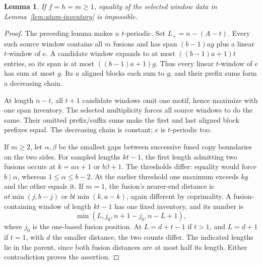 \documentclass[11pt,a4paper]{amsart}
\numberwithin{equation}{section}
\theoremstyle{plain}
\newtheorem{lemma}[theorem]{Lemma}
\theoremstyle{definition}
\begin{document}
\begin{lemma}\label{lem:equal-fusions}
If \(f=h=m\ge1\), equality of the selected window data in Lemma~\ref{lem:atom-inventory} is impossible.
\end{lemma}
\begin{proof}
The preceding lemma makes \(u\) \(t\)-periodic.  Set \(L_+=n-(A-t)\).  Every such source window contains all \(m\) fusions and has span \((b-1)ag\) plus a linear \(t\)-window of \(e\).  A candidate window expands to at most \(((b-1)a+1)t\) entries, so its span is at most \(((b-1)a+1)g\).  Thus every linear \(t\)-window of \(e\) has sum at most \(g\).  Its \(a\) aligned blocks each sum to \(g\), and their prefix sums form a decreasing chain.

At length \(n-t\), all \(t+1\) candidate windows omit one motif, hence maximize with one span inventory.  The selected multiplicity forces all source windows to do the same.  Their omitted prefix/suffix sums make the first and last aligned block prefixes equal.  The decreasing chain is constant; \(e\) is \(t\)-periodic too.

If \(m\ge2\), let \(\alpha,\beta\) be the smallest gaps between successive fused copy boundaries on the two sides.  For sampled lengths \(kt-1\), the first length admitting two fusions occurs at \(k=a\alpha+1\) or \(b\beta+1\).  The thresholds differ: equality would force \(b\mid\alpha\), whereas \(1\le\alpha\le b-2\).  At the earlier threshold one maximum exceeds \(kg\) and the other equals it.  If \(m=1\), the fusion's nearer-end distance is \(at\min(j,b-j)\) or \(bt\min(k,a-k)\), again different by coprimality.  A fusion-containing window of length \(kt-1\) has one fixed inventory, and its number is
\[
 \min(L,j_0,n+1-j_0,n-L+1),
\]
where \(j_0\) is the one-based fusion position.  At \(L=d+t-1\) if \(t>1\), and \(L=d+1\) if \(t=1\), with \(d\) the smaller distance, the two counts differ.  The indicated lengths lie in the parent, since both fusion distances are at most half its length.  Either contradiction proves the assertion.
\end{proof}
\end{document}
